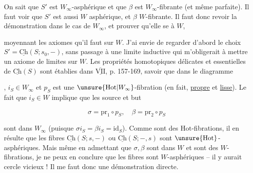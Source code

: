 On sait que $S'$ est $W_\infty$-asphérique et que $\beta$ est $W_\infty$-fibrante (et même parfaite). Il faut voir que $S'$ est aussi $W$ asphérique, et $\beta$ $W$-fibrante. Il faut donc revoir la démonstration dans le cas de $W_\infty$, et prouver qu'elle se  à $W$,


moyennant les axiomes qu'il faut sur $W$. J'ai envie de regarder d'abord le choix $S'=\underline{\mathrm{Ch}}(S;s_0,-)$, sans passage à une limite inductive qui m'obligerait à mettre un axiome de limites sur $W$. Les  propriétés homotopiques délicates et essentielles de $\underline{\mathrm{Ch}}(S)$ sont établies dans $\overline{\underline{\mathrm{VII}}}$, p. 157-169, savoir que dans le diagramme

, $i_S\in W_\infty$ et $p_S$ est une $\unsure{\mathrm{Hot}|W_\infty}$-fibration (en fait, \uline{propre} et \uline{lisse}). Le fait que $i_S\in W$ implique que les  source et but


\[
\sigma=\mathrm{pr}_1\circ p_S,\quad \beta=\mathrm{pr}_2\circ p_S
\]

sont dans $W_\infty$ (puisque $\sigma i_S=\beta i_S=\mathrm{id}_S$). Comme  sont des $\mathrm{Hot}$-fibrations, il en résulte que les fibres $\underline{\mathrm{Ch}}(S;s,-)$ ou $\underline{\mathrm{Ch}}(S;-,s)$ sont $\unsure{\mathrm{Hot}}$-asphériques. Mais même en admettant que $\sigma,\beta$ sont dans $W$ et sont des $W$-fibrations, je ne peux en conclure  que les fibres sont $W$-asphériques -- il y aurait cercle vicieux ! Il me faut donc une démonstration directe.

